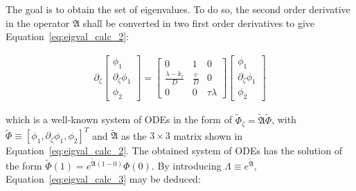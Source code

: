 The goal is to obtain the set of eigenvalues. To do so, the second order derivative in the operator $\mathfrak{A}$ shall be converted in two first order derivatives to give Equation~\ref{eq:eigval_calc_2}:

\begin{equation} \label{eq:eigval_calc_2}
    \begin{aligned}
        \partial_\zeta \begin{bmatrix}
            \phi_1 \\ \partial_\zeta \phi_1 \\ \phi_2
        \end{bmatrix} = \begin{bmatrix}
            0 & 1 & 0 \\
            \frac{\lambda-k_r}{D} & \frac{v}{D} & 0 \\
            0 & 0 & \tau \lambda 
        \end{bmatrix} \begin{bmatrix}
            \phi_1 \\ \partial_\zeta \phi_1 \\ \phi_2
        \end{bmatrix}
    \end{aligned}
\end{equation}

which is a well-known system of ODEs in the form of $ \tilde{\Phi}_\zeta  = \tilde{\mathfrak{A}} \tilde{\Phi}$, with $\tilde{\Phi} \equiv [\phi_1, \partial_\zeta \phi_1, \phi_2]^T$ and $\tilde{\mathfrak{A}}$ as the $3 \times 3$ matrix shown in Equation~\ref{eq:eigval_calc_2}. The obtained system of ODEs has the solution of the form $\tilde{\Phi}(1) = e^{\tilde{\mathfrak{A}}(1-0)}\Phi(0)$. By introducing $\Lambda \equiv e^{\tilde{\mathfrak{A}}}$, Equation~\ref{eq:eigval_calc_3} may be deduced:

